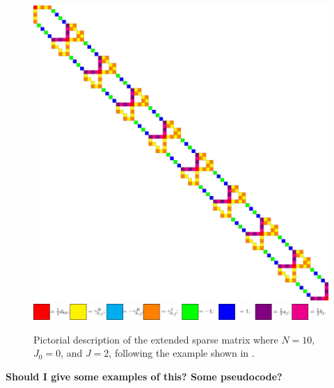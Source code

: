 \documentclass[manuscript, letterpaper]{aastex6}
\newcommand{\figurelabel}[1]{\label{fig:#1}}
\begin{document}
\begin{figure}[!htbp]
\begin{center}
\includegraphics[scale=0.175]{figures/twoterm.pdf}
\hspace{0.2in}
\includegraphics[scale=0.85]{figures/colorcode.pdf}
\end{center}
\caption{Pictorial description of the extended sparse matrix where $N=10$, $J_0=0$, and $J=2$, following
the example shown in \citet{Ambikasaran:2015}.}
\figurelabel{matrix_structure}
\end{figure}

{\bf Should I give some examples of this?  Some pseudocode?}


\end{document}
